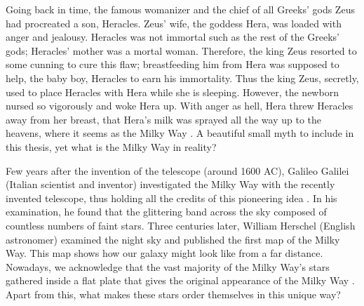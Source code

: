 Going back in time, the famous womanizer and the chief of all Greeks' gods Zeus had procreated a son, Heracles. Zeus' wife, the goddess Hera, was loaded with anger and jealousy. Heracles was not immortal such as the rest of the Greeks' gods; Heracles' mother was a mortal woman. Therefore, the king Zeus resorted to some cunning to cure this flaw; breastfeeding him from Hera was supposed to help, the baby boy, Heracles to earn his immortality. Thus the king Zeus, secretly, used to place Heracles with Hera while she is sleeping. However, the newborn nursed so vigorously and woke Hera up. With anger as hell, Hera threw Heracles away from her breast, that Hera's milk was sprayed all the way up to the heavens, where it seems as the Milky Way \citep{2019AAS...23314620T}. A beautiful small myth to include in this thesis, yet what is the Milky Way in reality?


Few years after the invention of the telescope (around 1600 AC), Galileo Galilei (Italian scientist and inventor) investigated the Milky Way with the recently invented telescope, thus holding all the credits of this pioneering idea \citep{2010JHA....41..120B}. In his examination, he found that the glittering band across the sky composed of countless numbers of faint stars. Three centuries later, William Herschel (English astronomer) examined the night sky and published the first map of  the Milky Way. This map shows how our galaxy might look like from a far distance. Nowadays, we acknowledge that the vast majority of the Milky Way's stars gathered inside a flat plate that gives the original appearance of the Milky Way \citep{2018JAHH...21..251C}. Apart from this, what makes these stars order themselves in this unique way?

